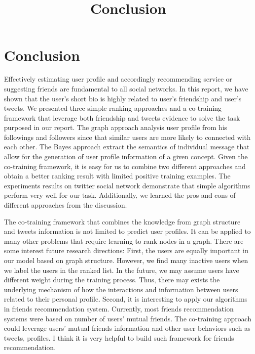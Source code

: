 \documentclass{article}
\begin{document}
\title{Conclusion}
\maketitle \else \fi

\section{Conclusion}\label{sec:conclusion}
Effectively estimating user profile and accordingly recommending service or suggesting friends are fundamental to all social networks. In this report, we have shown that the user's short bio is highly related to user's friendship and user's tweets. We presented three simple ranking approaches and a co-training framework that leverage both friendship and tweets evidence to solve the task purposed in our report. The graph approach analysis user profile from his followings and followers since that similar users are more likely to connected with each other. The Bayes approach extract the semantics of individual message that allow for the generation of user profile information of a given concept. Given the co-training framework, it is easy for us to combine two different approaches and obtain a better ranking result with limited positive training examples. The experiments results on twitter social network demonstrate that simple algorithms perform very well for our task. Additionally, we learned the pros and cons of different approaches from the discussion.

The co-training framework that combines the knowledge from graph structure and tweets information is not limited to predict user profiles. It can be applied to many other problems that require learning to rank nodes in a graph. There are some interest future research directions: First, the users are equally important in our model based on graph structure. However, we find many inactive users when we label the users in the ranked list. In the future, we may assume users have different weight during the training process. Thus, there may exists the underlying mechanism of how the interactions and information between users related to their personal profile. Second, it is interesting to apply our algorithms in friends recommendation system. Currently, most friends recommendation systems were based on number of users' mutual friends. The co-training approach could leverage users' mutual friends information and other user behaviors such as tweets, profiles. I think it is very helpful to build such framework for friends recommendation.

\ifx \allfiles \undefined
\end{document}
